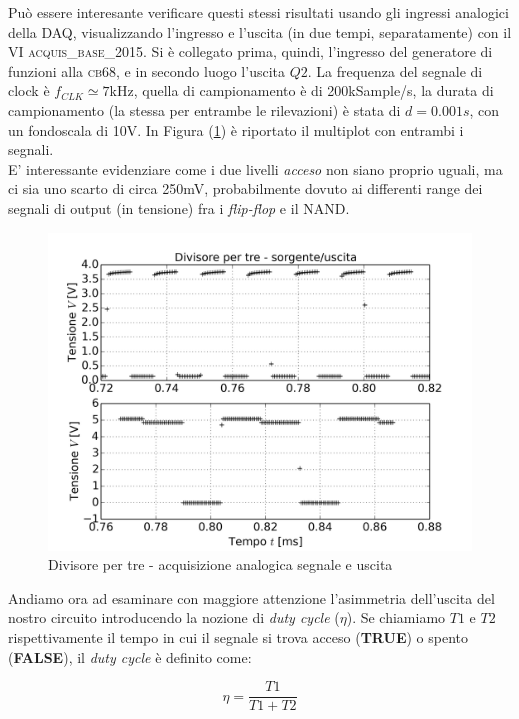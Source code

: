 \documentclass[journal, a4paper]{IEEEtran}
\begin{document}
Può essere interesante verificare questi stessi risultati usando gli ingressi analogici della \textsc{DAQ}, visualizzando l'ingresso e l'uscita (in due tempi, separatamente) con il VI \textsc{acquis\_base\_2015}. Si è collegato prima, quindi, l'ingresso del generatore di funzioni alla \textsc{cb68}, e in secondo luogo l'uscita $Q2$. La frequenza del segnale di clock è $f_{CLK} \simeq 7$kHz, quella di campionamento è di 200kSample/s, la durata di campionamento (la stessa per entrambe le rilevazioni) è stata di $d = 0.001s$, con un fondoscala di 10V. In Figura (\ref{fig:es12_prova}) è riportato il multiplot con entrambi i segnali.\\
E' interessante evidenziare come i due livelli \textit{acceso} non siano proprio uguali, ma ci sia uno scarto di circa 250mV, probabilmente dovuto ai differenti range dei segnali di output (in tensione) fra i \textit{flip-flop} e il \textsc{NAND}.\\

\begin{figure}
\centering
\includegraphics[width=0.8\linewidth]{./es12_prova}
\caption{Divisore per tre - acquisizione analogica segnale e uscita}
\label{fig:es12_prova}
\end{figure}

Andiamo ora ad esaminare con maggiore attenzione l'asimmetria dell'uscita del nostro circuito introducendo la nozione di \textit{duty cycle} ($\eta$). Se chiamiamo $T1$ e $T2$ rispettivamente il tempo in cui il segnale si trova acceso (\textbf{TRUE}) o spento (\textbf{FALSE}), il \textit{duty cycle} è definito come:

\begin{equation}
\eta = \frac{T1}{T1 + T2}
\end{equation}
\end{document}

